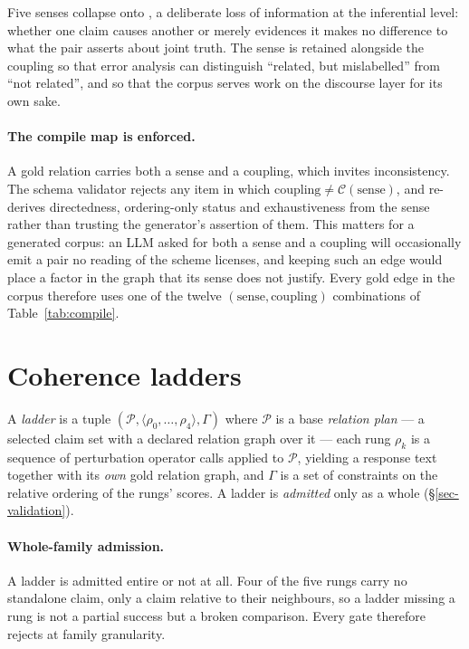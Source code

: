 Five senses collapse onto \ent{}, a deliberate loss of information at the inferential level: whether one
claim causes another or merely evidences it makes no difference to what the pair asserts about joint truth.
The sense is retained alongside the coupling so that error analysis can distinguish ``related, but
mislabelled'' from ``not related'', and so that the corpus serves work on the discourse layer for its own
sake.

\paragraph{The compile map is enforced.} A gold relation carries both a sense and a coupling, which
invites inconsistency. The schema validator rejects any item in which
$\text{coupling}\neq\mathcal{C}(\text{sense})$, and re-derives directedness, ordering-only status and
exhaustiveness from the sense rather than trusting the generator's assertion of them. This matters for a
generated corpus: an LLM asked for both a sense and a coupling will occasionally emit a pair no reading of
the scheme licenses, and keeping such an edge would place a factor in the graph that its sense does not
justify. Every gold edge in the corpus therefore uses one of the twelve $(\text{sense},\text{coupling})$
combinations of Table~\ref{tab:compile}.

\section{Coherence ladders}
\label{sec-ladders}

\begin{definition}
\label{def-ladder}
A \emph{ladder} is a tuple $(\mathcal{P},\langle\rho_0,\dots,\rho_4\rangle,\Gamma)$ where $\mathcal{P}$ is
a base \emph{relation plan} --- a selected claim set with a declared relation graph over it --- each rung
$\rho_k$ is a sequence of perturbation operator calls applied to $\mathcal{P}$, yielding a response text
together with its \emph{own} gold relation graph, and $\Gamma$ is a set of constraints on the relative
ordering of the rungs' scores. A ladder is \emph{admitted} only as a whole (\S\ref{sec-validation}).
\end{definition}

\paragraph{Whole-family admission.} A ladder is admitted entire or not at all. Four of the five rungs carry
no standalone claim, only a claim relative to their neighbours, so a ladder missing a rung is not a partial
success but a broken comparison. Every gate therefore rejects at family granularity.

